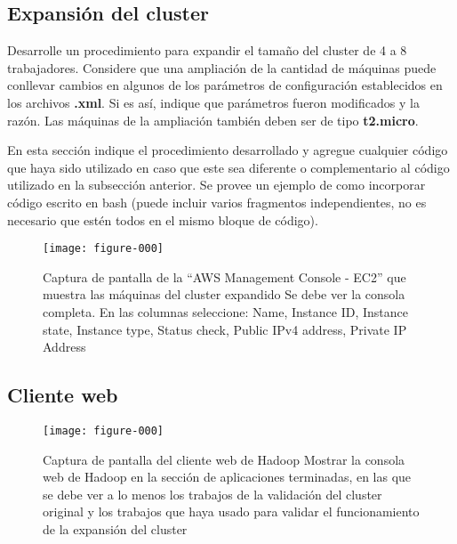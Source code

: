 \documentclass[12pt,letterpaper,twoside]{article}
\begin{document}
\subsection{Expansión del cluster}

{\color{red} Desarrolle un procedimiento para expandir el tamaño del cluster de 4 a 8 trabajadores. Considere que una ampliación de la cantidad de máquinas puede conllevar cambios en algunos de los parámetros de configuración establecidos en los archivos \textbf{.xml}. Si es así, indique que parámetros fueron modificados y la razón. Las máquinas de la ampliación también deben ser de tipo \textbf{t2.micro}.}

{\color{red} En esta sección indique el procedimiento desarrollado y agregue cualquier código que haya sido utilizado en caso que este sea diferente o complementario al código utilizado en la subsección anterior. Se provee un ejemplo de como incorporar código escrito en bash (puede incluir varios fragmentos independientes, no es necesario que estén todos en el mismo bloque de código).}

\begin{code}[H]

\end{code}

\begin{figure}[H]
    \centering
    \texttt{[image: figure-000]}
    \caption{Captura de pantalla de la ``AWS Management Console - EC2'' que muestra las máquinas del cluster expandido
    {\color{red} Se debe ver la consola completa. En las columnas seleccione: Name, Instance ID, Instance state, Instance type, Status check, Public IPv4 address, Private IP Address}}
    \label{fig:002}
\end{figure}

\subsection{Cliente web}

\begin{figure}[H]
    \centering
    \texttt{[image: figure-000]}
    \caption{Captura de pantalla del cliente web de Hadoop
    {\color{red} Mostrar la consola web de Hadoop en la sección de aplicaciones terminadas, en las que se debe ver a lo menos los trabajos de la validación del cluster original y los trabajos que haya usado para validar el funcionamiento de la expansión del cluster}}
    \label{fig:003}
\end{figure}
\end{document}
